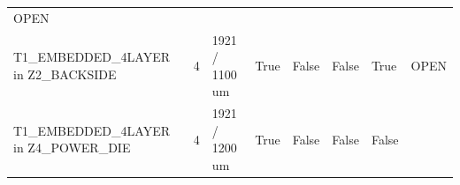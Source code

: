 \documentclass[10pt,]{article}
\begin{document}
\begin{longtable}[]{@{}llllllll@{}}
\begin{minipage}[t]{0.10\columnwidth}
OPEN\strut
\end{minipage}\tabularnewline
\begin{minipage}[t]{0.10\columnwidth}\raggedright
T1\_EMBEDDED\_4LAYER in Z2\_BACKSIDE\strut
\end{minipage} & \begin{minipage}[t]{0.10\columnwidth}\raggedright
4\strut
\end{minipage} & \begin{minipage}[t]{0.10\columnwidth}\raggedright
1921 / 1100 um\strut
\end{minipage} & \begin{minipage}[t]{0.10\columnwidth}\raggedright
True\strut
\end{minipage} & \begin{minipage}[t]{0.10\columnwidth}\raggedright
False\strut
\end{minipage} & \begin{minipage}[t]{0.10\columnwidth}\raggedright
False\strut
\end{minipage} & \begin{minipage}[t]{0.10\columnwidth}\raggedright
True\strut
\end{minipage} & \begin{minipage}[t]{0.10\columnwidth}\raggedright
OPEN\strut
\end{minipage}\tabularnewline
\begin{minipage}[t]{0.10\columnwidth}\raggedright
T1\_EMBEDDED\_4LAYER in Z4\_POWER\_DIE\strut
\end{minipage} & \begin{minipage}[t]{0.10\columnwidth}\raggedright
4\strut
\end{minipage} & \begin{minipage}[t]{0.10\columnwidth}\raggedright
1921 / 1200 um\strut
\end{minipage} & \begin{minipage}[t]{0.10\columnwidth}\raggedright
True\strut
\end{minipage} & \begin{minipage}[t]{0.10\columnwidth}\raggedright
False\strut
\end{minipage} & \begin{minipage}[t]{0.10\columnwidth}\raggedright
False\strut
\end{minipage} & \begin{minipage}[t]{0.10\columnwidth}\raggedright
False\strut
\end{minipage} & \begin{minipage}[t]{0.10\columnwidth}\raggedright

\end{minipage}
\end{longtable}
\end{document}

